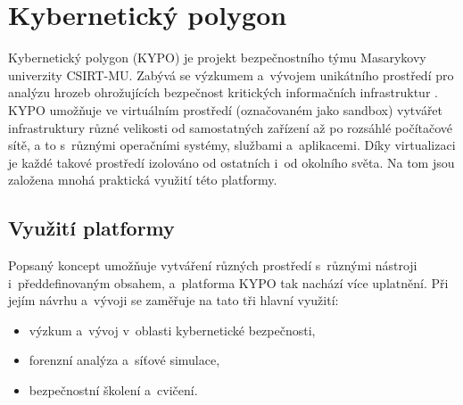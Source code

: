 \documentclass[
  digital, %
  oneside, %
  table,   %
  nolof,     %
  nolot,     %
]{fithesis3}
\begin{document}
\chapter{Kybernetický polygon}
Kybernetický polygon (KYPO) je projekt bezpečnostního týmu Masarykovy univerzity CSIRT-MU. Zabývá se výzkumem a~vývojem unikátního prostředí pro analýzu hrozeb ohrožujících bezpečnost kritických informačních infrastruktur \cite{kypocz}. KYPO umožňuje ve virtuálním prostředí (označovaném jako sandbox) vytvářet infrastruktury různé velikosti od samostatných zařízení až po rozsáhlé počítačové sítě, a to s~různými operačními systémy, službami a~aplikacemi. Díky virtualizaci je každé takové prostředí izolováno od ostatních i~od okolního světa. Na tom jsou založena mnohá praktická využití této platformy.

\section{Využití platformy}
Popsaný koncept umožňuje vytváření různých prostředí s~různými nástroji i~předdefinovaným obsahem, a~platforma KYPO tak nachází více uplatnění. Při jejím návrhu a~vývoji se zaměřuje na tato tři hlavní využití: \cite{kypo2017}
\begin{itemize}
\item výzkum a~vývoj v~oblasti kybernetické bezpečnosti,
\item forenzní analýza a~síťové simulace,
\item bezpečnostní školení a~cvičení.
\end{itemize}
\end{document}
